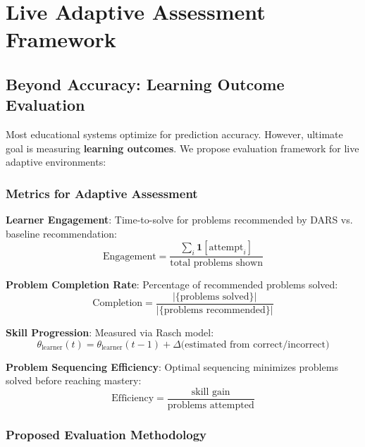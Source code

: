 \documentclass[conference]{IEEEtran}
\begin{document}
\section{Live Adaptive Assessment Framework}

\subsection{Beyond Accuracy: Learning Outcome Evaluation}

Most educational systems optimize for prediction accuracy. However, ultimate goal is measuring \textbf{learning outcomes}. We propose evaluation framework for live adaptive environments:

\subsubsection{Metrics for Adaptive Assessment}

\textbf{Learner Engagement}: Time-to-solve for problems recommended by DARS vs. baseline recommendation:
\begin{equation}
\text{Engagement} = \frac{\sum_i \mathbf{1}[\text{attempt}_i]}{\text{total problems shown}}
\end{equation}

\textbf{Problem Completion Rate}: Percentage of recommended problems solved:
\begin{equation}
\text{Completion} = \frac{|\{\text{problems solved}\}|}{|\{\text{problems recommended}\}|}
\end{equation}

\textbf{Skill Progression}: Measured via Rasch model:
\begin{equation}
\theta_{\text{learner}}(t) = \theta_{\text{learner}}(t-1) + \Delta \text{(estimated from correct/incorrect)}
\end{equation}

\textbf{Problem Sequencing Efficiency}: Optimal sequencing minimizes problems solved before reaching mastery:
\begin{equation}
\text{Efficiency} = \frac{\text{skill gain}}{\text{problems attempted}}
\end{equation}

\subsubsection{Proposed Evaluation Methodology}
\end{document}
